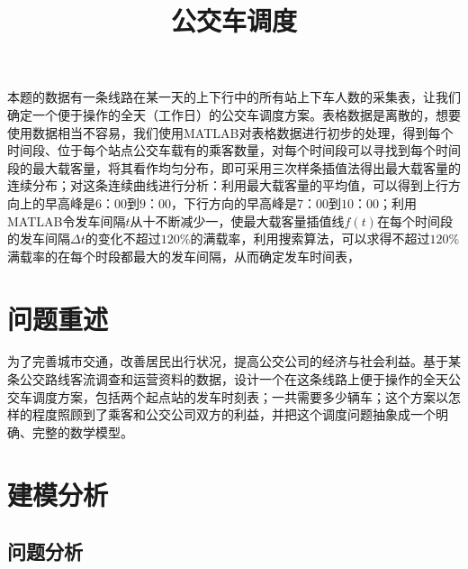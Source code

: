\documentclass{cumcmart}
\begin{document}


\title{公交车调度}
\maketitle
\begin{cnabstract}%
本题的数据有一条线路在某一天的上下行中的所有站上下车人数的采集表，让我们确定一个便于操作的全天（工作日）的公交车调度方案。表格数据是离散的，想要使用数据相当不容易，我们使用MATLAB对表格数据进行初步的处理，得到每个时间段、位于每个站点公交车载有的乘客数量，对每个时间段可以寻找到每个时间段的最大载客量，将其看作均匀分布，即可采用三次样条插值法得出最大载客量的连续分布；对这条连续曲线进行分析：利用最大载客量的平均值，可以得到上行方向上的早高峰是$6：00$到$9：00$，下行方向的早高峰是$7：00$到$10：00$；利用MATLAB令发车间隔$t$从十不断减少一，使最大载客量插值线$f(t)$在每个时间段的发车间隔$\Delta t$的变化不超过$120\%$的满载率，利用搜索算法，可以求得不超过$120\%$满载率的在每个时段都最大的发车间隔，从而确定发车时间表，

\end{cnabstract}

\newpage


\section{问题重述}
为了完善城市交通，改善居民出行状况，提高公交公司的经济与社会利益。基于某条公交路线客流调查和运营资料的数据，设计一个在这条线路上便于操作的全天公交车调度方案，包括两个起点站的发车时刻表；一共需要多少辆车；这个方案以怎样的程度照顾到了乘客和公交公司双方的利益，并把这个调度问题抽象成一个明确、完整的数学模型。

\section{建模分析}

\subsection{问题分析}
\end{document}

